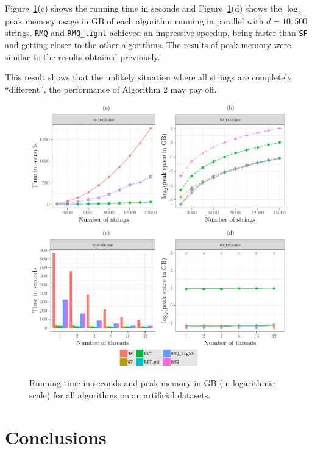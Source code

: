 \documentclass{elsarticle}
\newcommand{\st}{\texttt{SF}\xspace}
\newcommand{\gog}{\texttt{RMQ\_light}\xspace}
\newcommand{\gognz}{\texttt{RMQ}\xspace}
\begin{document}
Figure~\ref{f:worst}(c) shows the running time in seconds
and Figure~\ref{f:worst}(d) shows the $\log_2$ peak memory usage in GB
of each algorithm
running in parallel with $d=10,500$ strings.
\gognz and \gog achieved an
impressive speedup, being faster than \st and getting closer to the
other algorithms.
The results of peak memory were similar to the results obtained previously.

This result shows that the unlikely situation where all strings are completely
``different'', the performance of Algorithm 2 may pay off.


\begin{figure}
 \centering
 \includegraphics[width=1.0\textwidth]{fig_all_worstcase.pdf}
 \includegraphics[width=1.0\textwidth]{fig_all_worstcase_parallel.pdf}
\caption{Running time in seconds and peak memory in GB (in logarithmic
  scale) for all algorithms on an artificial datasets.}
\label{f:worst}
\end{figure}


\section{Conclusions}\label{s:conclusion}
\end{document}
